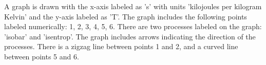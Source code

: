 A graph is drawn with the x-axis labeled as 's' with units 'kilojoules per kilogram Kelvin' and the y-axis labeled as 'T'. The graph includes the following points labeled numerically: 1, 2, 3, 4, 5, 6. There are two processes labeled on the graph: 'isobar' and 'isentrop'. The graph includes arrows indicating the direction of the processes. There is a zigzag line between points 1 and 2, and a curved line between points 5 and 6.